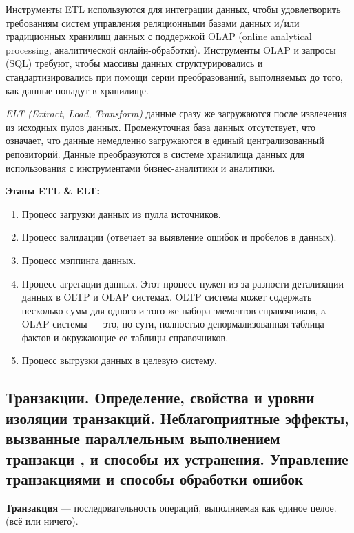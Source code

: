Инструменты ETL используются для интеграции данных, чтобы удовлетворить требованиям систем управления реляционными базами данных и/или традиционных хранилищ данных с поддержкой OLAP (online analytical processing, аналитической онлайн-обработки). Инструменты OLAP и запросы (SQL) требуют, чтобы массивы данных структурировались и стандартизировались при помощи серии преобразований, выполняемых до того, как данные попадут в хранилище.

\textit{ELT (Extract, Load, Transform)} данные сразу же загружаются после извлечения из исходных пулов данных. Промежуточная база данных отсутствует, что означает, что данные немедленно загружаются в единый централизованный репозиторий. Данные преобразуются в системе хранилища данных для использования с инструментами бизнес-аналитики и аналитики.

\textbf{Этапы ETL \&  ELT:}
\begin{enumerate}
	\item Процесс загрузки данных из пулла источников.
	\item Процесс валидации (отвечает за выявление ошибок и пробелов в данных).
	\item Процесс мэппинга данных.
	\item Процесс агрегации данных. Этот процесс нужен из-за разности детализации данных в OLTP и OLAP системах.
	OLTP система может содержать несколько сумм для одного и того же набора элементов справочников, a OLAP-системы — это, по сути, полностью денормализованная таблица фактов и окружающие ее таблицы справочников.
	\item Процесс выгрузки данных в целевую систему.
\end{enumerate}

\newpage

\subsection{Транзакции. Определение, свойства и уровни изоляции транзакций. Неблагоприятные эффекты, вызванные параллельным выполнением транзакци , и способы их устранения. Управление транзакциями и способы обработки ошибок}

\textbf{Транзакция} --- последовательность операций, выполняемая как единое целое. (всё или ничего).

